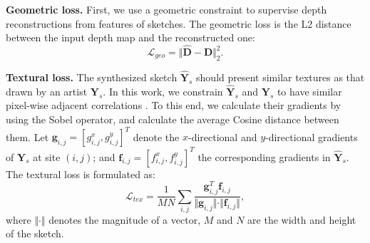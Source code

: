 \documentclass[10pt,twocolumn,letterpaper]{article}
\begin{document}
\textbf{Geometric loss.}
First, we use a geometric constraint to supervise depth reconstructions from features of sketches.
The geometric loss is the L2 distance between the input depth map and the reconstructed one: 
\begin{equation}
	\mathcal{L}_{geo} = \Vert \hat{\mathbf{D}} - \mathbf{D} \Vert_2^2.
\end{equation}

\textbf{Textural loss.}
The synthesized sketch $\hat{\mathbf{Y}}_s$ should present similar textures as that drawn by an artist $\mathbf{Y}_s$. In this work, we constrain $\hat{\mathbf{Y}}_s$ and $\mathbf{Y}_s$ to have similar pixel-wise adjacent correlations \cite{li2021genre}. To this end, we calculate their gradients by using the Sobel operator, and calculate the average Cosine distance between them. Let $\mathbf{g}_{i,j} = [g^x_{i,j}, g^y_{i,j}]^T$ denote the $x$-directional and $y$-directional gradients of $\mathbf{Y}_s$ at site $(i,j)$; and $\mathbf{f}_{i,j} = [f^x_{i,j}, f^y_{i,j}]^T$ the corresponding gradients in $\hat{\mathbf{Y}}_s$. 
The textural loss is formulated as: 
\begin{equation}
	\mathcal{L}_{tex} = \frac{1}{MN} \sum_{i,j}  \frac{\mathbf{g}_{i,j}^T \mathbf{f}_{i,j}}{\Vert \mathbf{g}_{i,j} \Vert \cdot \Vert \mathbf{f}_{i,j} \Vert},
\end{equation}
where $\Vert \cdot \Vert$ denotes the magnitude of a vector, $M$ and $N$ are the width and height of the sketch.
\end{document}
